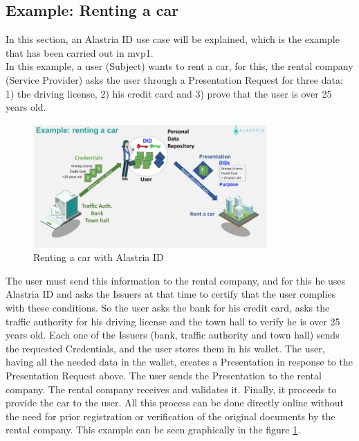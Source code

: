 \documentclass[a4paper, 12pt]{article} %
\begin{document}
    \subsection{Example: Renting a car}
        In this section, an Alastria ID use case will be explained, which is the example that has been carried out in \acrshort{mvp}1\cite{mvp1-car}.\\
        
        In this example, a user (Subject) wants to rent a car, for this, the rental company (Service Provider) asks the user through a Presentation Request for three data: 1) the driving license, 2) his credit card and 3) prove that the user is over 25 years old. 
        \begin{figure}[h]
            \centering
            \includegraphics[width=0.8\textwidth]{ala-rent-car.png}
            \caption{Renting a car with Alastria ID}
            \label{fig:ex-car}
        \end{figure}
        The user must send this information to the rental company, and for this he uses Alastria ID and asks the Issuers at that time to certify that the user complies with these conditions. So the user asks the bank for his credit card, asks the traffic authority for his driving license and the town hall to verify he is over 25 years old. Each one of the Issuers (bank, traffic authority and town hall) sends the requested Credentials, and the user stores them in his wallet. The user, having all the needed data in the wallet, creates a Presentation in response to the Presentation Request above. The user sends the Presentation to the rental company. The rental company receives and validates it. Finally, it proceeds to provide the car to the user. All this process can be done directly online without the need for prior registration or verification of the original documents by the rental company. This example can be seen graphically in the figure \ref{fig:ex-car}.\\
\end{document}
